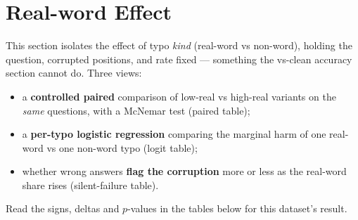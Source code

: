 \documentclass[11pt]{article}
\begin{document}
\section*{Real-word Effect}
\noindent This section isolates the effect of typo \emph{kind}
(real-word vs non-word), holding the question, corrupted positions, and rate fixed ---
something the vs-clean accuracy section cannot do. Three views:
\begin{itemize}\setlength{\itemsep}{1pt}
  \item a \textbf{controlled paired} comparison of low-real vs high-real variants on
  the \emph{same} questions, with a McNemar test (paired table);
  \item a \textbf{per-typo logistic regression} comparing the marginal harm of one
  real-word vs one non-word typo (logit table);
  \item whether wrong answers \textbf{flag the corruption} more or less as the
  real-word share rises (silent-failure table).
\end{itemize}
\noindent Read the signs, deltas and $p$-values in the tables below for this
dataset's result.
\medskip
\end{document}
